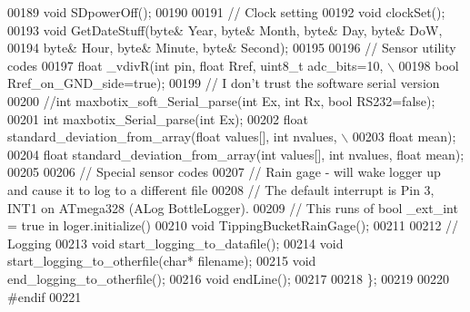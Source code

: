 \begin{DoxyCode}
00189     \textcolor{keywordtype}{void} SDpowerOff();
00190     
00191     \textcolor{comment}{// Clock setting}
00192     \textcolor{keywordtype}{void} clockSet();
00193     \textcolor{keywordtype}{void} GetDateStuff(byte& Year, byte& Month, byte& Day, byte& DoW, 
00194         byte& Hour, byte& Minute, byte& Second);
00195     
00196     \textcolor{comment}{// Sensor utility codes}
00197     \textcolor{keywordtype}{float} \_vdivR(\textcolor{keywordtype}{int} pin, \textcolor{keywordtype}{float} Rref, uint8\_t adc\_bits=10, \(\backslash\)
00198           \textcolor{keywordtype}{bool} Rref\_on\_GND\_side=\textcolor{keyword}{true});
00199     \textcolor{comment}{// I don't trust the software serial version}
00200     \textcolor{comment}{//int maxbotix\_soft\_Serial\_parse(int Ex, int Rx, bool RS232=false);}
00201     \textcolor{keywordtype}{int} maxbotix\_Serial\_parse(\textcolor{keywordtype}{int} Ex);
00202     \textcolor{keywordtype}{float} standard\_deviation\_from\_array(\textcolor{keywordtype}{float} values[], \textcolor{keywordtype}{int} nvalues, \(\backslash\)
00203           \textcolor{keywordtype}{float} mean);
00204     \textcolor{keywordtype}{float} standard\_deviation\_from\_array(\textcolor{keywordtype}{int} values[], \textcolor{keywordtype}{int} nvalues, \textcolor{keywordtype}{float} mean);
00205 
00206     \textcolor{comment}{// Special sensor codes}
00207     \textcolor{comment}{// Rain gage - will wake logger up and cause it to log to a different file}
00208     \textcolor{comment}{// The default interrupt is Pin 3, INT1 on ATmega328 (ALog BottleLogger).}
00209     \textcolor{comment}{// This runs of bool \_ext\_int = true in loger.initialize()}
00210     \textcolor{keywordtype}{void} TippingBucketRainGage();
00211     
00212     \textcolor{comment}{// Logging}
00213     \textcolor{keywordtype}{void} start\_logging\_to\_datafile();
00214     \textcolor{keywordtype}{void} start\_logging\_to\_otherfile(\textcolor{keywordtype}{char}* filename);
00215     \textcolor{keywordtype}{void} end\_logging\_to\_otherfile();
00216     \textcolor{keywordtype}{void} endLine();
00217 
00218 \};
00219 
00220 \textcolor{preprocessor}{#endif  }
00221 
\end{DoxyCode}
